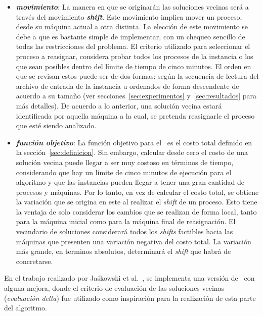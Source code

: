 \documentclass[../informe2.tex]{subfiles}
\begin{document}
\begin{itemize}
	\item \textbf{\textit{movimiento}}: La manera en que se originarán las soluciones vecinas será a través del movimiento \textbf{\textit{shift}}. Este movimiento implica mover un proceso, desde su máquina actual a otra distinta. La elección de este movimiento se debe a que es bastante simple de implementar, con un chequeo sencillo de todas las restricciones del problema. El criterio utilizado para seleccionar el proceso a reasignar, considera probar todos los procesos de la instancia o los que sean posibles dentro del límite de tiempo de cinco minutos. El orden en que se revisan estos puede ser de dos formas: según la secuencia de lectura del archivo de entrada de la instancia u ordenados de forma descendente de acuerdo a su tamaño (ver secciones~\ref{sec:experimentos} y~\ref{sec:resultados} para más detalles). De acuerdo a lo anterior, una solución vecina estará identificada por aquella máquina a la cual, se pretenda reasignarle el proceso que esté siendo analizado.
	\item \textbf{\textit{función objetivo}}: La función objetivo para el \mrp\ es el costo total definido en la sección~\ref{sec:definicion}. Sin embargo, calcular desde cero el costo de una solución vecina puede llegar a ser muy costoso en términos de tiempo, considerando que hay un límite de cinco minutos de ejecución para el algoritmo y que las instancias pueden llegar a tener una gran cantidad de procesos y máquinas. Por lo tanto, en vez de calcular el costo total, se obtiene la variación que se origina en este al realizar el \textit{shift} de un proceso. Esto tiene la ventaja de solo considerar los cambios que se realizan de forma local, tanto para la máquina inicial como para la máquina final de reasignación. El vecindario de soluciones considerará todos los \textit{shifts} factibles hacia las máquinas que presenten una variación negativa del costo total. La variación más grande, en terminos absolutos, determinará el \textit{shift} que habrá de concretarse.
\end{itemize}
En el trabajo realizado por Jaśkowski et al.~\cite{jaskowskihybrid}, se implementa una versión de \hillc\ con alguna mejora, donde el criterio de evaluación de las soluciones vecinas (\textit{evaluación delta}) fue utilizado como inspiración para la realización de esta parte del algoritmo.\\
\end{document}
